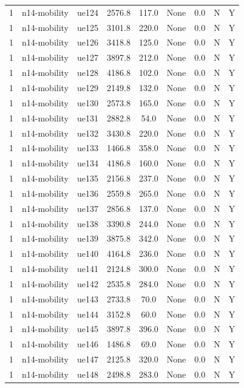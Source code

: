 \begin{table}[ht]
\begin{tabular}{|c|c|c|c|c|c|c|c|c|}
1 & n14-mobility & ue124 & 2576.8 & 117.0 & None & 0.0 & N & Y \\
1 & n14-mobility & ue125 & 3101.8 & 220.0 & None & 0.0 & N & Y \\
1 & n14-mobility & ue126 & 3418.8 & 125.0 & None & 0.0 & N & Y \\
1 & n14-mobility & ue127 & 3897.8 & 212.0 & None & 0.0 & N & Y \\
1 & n14-mobility & ue128 & 4186.8 & 102.0 & None & 0.0 & N & Y \\
1 & n14-mobility & ue129 & 2149.8 & 132.0 & None & 0.0 & N & Y \\
1 & n14-mobility & ue130 & 2573.8 & 165.0 & None & 0.0 & N & Y \\
1 & n14-mobility & ue131 & 2882.8 & 54.0 & None & 0.0 & N & Y \\
1 & n14-mobility & ue132 & 3430.8 & 220.0 & None & 0.0 & N & Y \\
1 & n14-mobility & ue133 & 1466.8 & 358.0 & None & 0.0 & N & Y \\
1 & n14-mobility & ue134 & 4186.8 & 160.0 & None & 0.0 & N & Y \\
1 & n14-mobility & ue135 & 2156.8 & 237.0 & None & 0.0 & N & Y \\
1 & n14-mobility & ue136 & 2559.8 & 265.0 & None & 0.0 & N & Y \\
1 & n14-mobility & ue137 & 2856.8 & 137.0 & None & 0.0 & N & Y \\
1 & n14-mobility & ue138 & 3390.8 & 244.0 & None & 0.0 & N & Y \\
1 & n14-mobility & ue139 & 3875.8 & 342.0 & None & 0.0 & N & Y \\
1 & n14-mobility & ue140 & 4164.8 & 236.0 & None & 0.0 & N & Y \\
1 & n14-mobility & ue141 & 2124.8 & 300.0 & None & 0.0 & N & Y \\
1 & n14-mobility & ue142 & 2535.8 & 284.0 & None & 0.0 & N & Y \\
1 & n14-mobility & ue143 & 2733.8 & 70.0 & None & 0.0 & N & Y \\
1 & n14-mobility & ue144 & 3152.8 & 60.0 & None & 0.0 & N & Y \\
1 & n14-mobility & ue145 & 3897.8 & 396.0 & None & 0.0 & N & Y \\
1 & n14-mobility & ue146 & 1486.8 & 69.0 & None & 0.0 & N & Y \\
1 & n14-mobility & ue147 & 2125.8 & 320.0 & None & 0.0 & N & Y \\
1 & n14-mobility & ue148 & 2498.8 & 283.0 & None & 0.0 & N & Y \\

\end{tabular}
\end{table}
